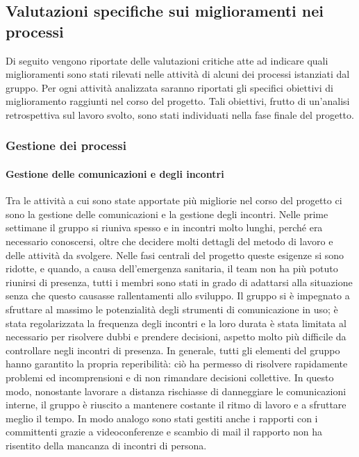 	\subsection{Valutazioni specifiche sui miglioramenti nei processi}
		Di seguito vengono riportate delle valutazioni critiche atte ad indicare quali miglioramenti sono stati rilevati nelle attività di alcuni dei processi istanziati dal gruppo. Per ogni attività analizzata saranno riportati gli specifici obiettivi di miglioramento raggiunti nel corso del progetto.	Tali obiettivi, frutto di un'analisi retrospettiva sul lavoro svolto, sono stati individuati nella fase finale del progetto.
	
		\subsubsection{Gestione dei processi}
			\paragraph{Gestione delle comunicazioni e degli incontri}
				Tra le attività a cui sono state apportate più migliorie nel corso del progetto ci sono la gestione delle comunicazioni e la gestione degli incontri.
				\newline
				Nelle prime settimane il gruppo si riuniva spesso e in incontri molto lunghi, perché era necessario conoscersi, oltre che decidere molti dettagli del metodo di lavoro e delle attività da svolgere. Nelle fasi centrali del progetto queste esigenze si sono ridotte, e quando, a causa dell'emergenza sanitaria, il team non ha più potuto riunirsi di presenza, tutti i membri sono stati in grado di adattarsi alla situazione senza che questo causasse rallentamenti allo sviluppo. Il gruppo si è impegnato a sfruttare al massimo le potenzialità degli strumenti di comunicazione in uso; è stata regolarizzata la frequenza degli incontri e la loro durata è stata limitata al necessario per risolvere dubbi e prendere decisioni, aspetto molto più difficile da controllare negli incontri di presenza.
				\newline
				In generale, tutti gli elementi del gruppo hanno garantito la propria reperibilità: ciò ha permesso di risolvere rapidamente problemi ed incomprensioni e di non rimandare decisioni collettive. In questo modo, nonostante lavorare a distanza rischiasse di danneggiare le comunicazioni interne, il gruppo è riuscito a mantenere costante il ritmo di lavoro e a sfruttare meglio il tempo. In modo analogo sono stati gestiti anche i rapporti con i committenti grazie a videoconferenze e scambio di mail il rapporto non ha risentito della mancanza di incontri di persona.
				
